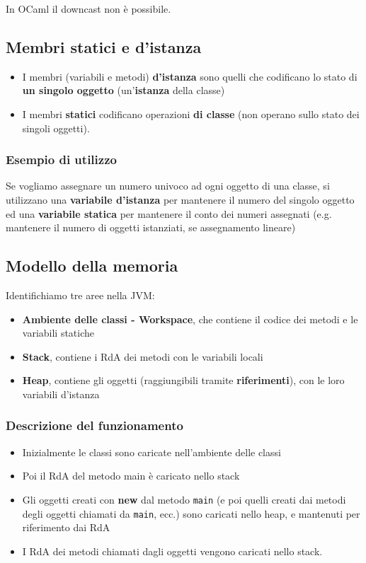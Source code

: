 \documentclass[a4paper,10pt]{article}
\begin{document}
In OCaml il downcast non è possibile.



\newpage
\subsection{Membri statici e d'istanza}
\begin{itemize}
 \item I membri (variabili e metodi) \textbf{d'istanza} sono quelli che codificano lo stato di \textbf{un singolo oggetto} (un'\textbf{istanza} della classe)
 \item I membri \textbf{statici} codificano operazioni \textbf{di classe} (non operano sullo stato dei singoli oggetti).
\end{itemize}

\subsubsection{Esempio di utilizzo}
Se vogliamo assegnare un numero univoco ad ogni oggetto di una classe, si utilizzano una \textbf{variabile d'istanza} per mantenere il numero del singolo oggetto ed una \textbf{variabile statica} per mantenere il conto dei numeri assegnati (e.g. mantenere il numero di oggetti istanziati, se assegnamento lineare)

\subsection{Modello della memoria}
Identifichiamo tre aree nella JVM:
\begin{itemize}
 \item \textbf{Ambiente delle classi - Workspace}, che contiene il codice dei metodi e le variabili statiche
 \item \textbf{Stack}, contiene i RdA dei metodi con le variabili locali
 \item \textbf{Heap}, contiene gli oggetti (raggiungibili tramite \textbf{riferimenti}), con le loro variabili d'istanza
\end{itemize}

\subsubsection{Descrizione del funzionamento}

\begin{itemize}
 \item Inizialmente le classi sono caricate nell'ambiente delle classi 
 \item Poi il RdA del metodo main è caricato nello stack
 \item Gli oggetti creati con \textbf{new} dal metodo \texttt{main} (e poi quelli creati dai metodi degli oggetti chiamati da \texttt{main}, ecc.) sono caricati nello heap, e mantenuti per riferimento dai RdA
 \item I RdA dei metodi chiamati dagli oggetti vengono caricati nello stack.
\end{itemize}
\end{document}
